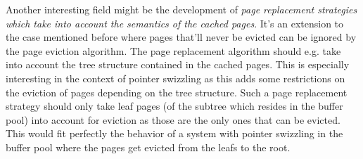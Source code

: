 	Another interesting field might be the development of \emph{page replacement strategies which take into account the semantics of the cached pages}. It's an extension to the case mentioned before where pages that'll never be evicted can be ignored by the page eviction algorithm. The page replacement algorithm should e.g. take into account the tree structure contained in the cached pages. This is especially interesting in the context of pointer swizzling as this adds some restrictions on the eviction of pages depending on the tree structure. Such a page replacement strategy should only take leaf pages (of the subtree which resides in the buffer pool) into account for eviction as those are the only ones that can be evicted. This would fit perfectly the behavior of a system with pointer swizzling in the buffer pool where the pages get evicted from the leafs to the root.
